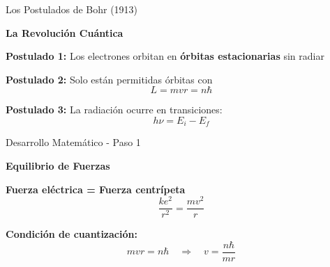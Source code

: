 \documentclass[12pt,aspectratio=169]{beamer}
\begin{document}
\begin{frame}{Los Postulados de Bohr (1913)}
    \begin{center}
        \huge \textbf{La Revolución Cuántica}
    \end{center}
    
    \vspace{1cm}
    \begin{center}
        \colorbox{azuloscuro!10}{\parbox{0.95\textwidth}{
            \Large \textbf{Postulado 1:} Los electrones orbitan en \textbf{órbitas estacionarias} sin radiar
        }}
    \end{center}
    
    \vspace{0.8cm}
    \begin{center}
        \colorbox{verdeclaro!10}{\parbox{0.95\textwidth}{
            \Large \textbf{Postulado 2:} Solo están permitidas órbitas con
            \Huge $$L = mvr = n\hbar$$
        }}
    \end{center}
    
    \vspace{0.8cm}
    \begin{center}
        \colorbox{naranjaclaro!10}{\parbox{0.95\textwidth}{
            \Large \textbf{Postulado 3:} La radiación ocurre en transiciones:
            \Huge $$h\nu = E_i - E_f$$
        }}
    \end{center}
\end{frame}

\begin{frame}{Desarrollo Matemático - Paso 1}
    \begin{center}
        \huge \textbf{Equilibrio de Fuerzas}
    \end{center}
    
    \vspace{1cm}
    \begin{center}
        \colorbox{azuloscuro!10}{\parbox{0.9\textwidth}{
            \begin{center}
                \Large \textbf{Fuerza eléctrica = Fuerza centrípeta}
                \vspace{0.5cm}
                \Huge $$\frac{ke^2}{r^2} = \frac{mv^2}{r}$$
            \end{center}
        }}
    \end{center}
    
    \vspace{1cm}
    \begin{center}
        \colorbox{verdeclaro!10}{\parbox{0.9\textwidth}{
            \begin{center}
                \Large \textbf{Condición de cuantización:}
                \vspace{0.5cm}
                \Huge $$mvr = n\hbar \quad \Rightarrow \quad v = \frac{n\hbar}{mr}$$
            \end{center}
        }}
    \end{center}
\end{frame}
\end{document}
